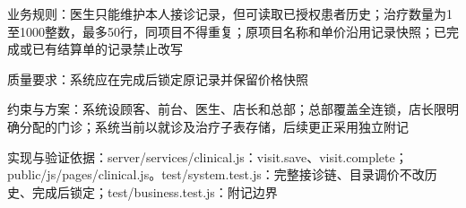 \documentclass[UTF8,12pt,a4paper,fontset=none]{ctexart}
\begin{document}
业务规则：医生只能维护本人接诊记录，但可读取已授权患者历史；治疗数量为1至1000整数，最多50行，同项目不得重复；原项目名称和单价沿用记录快照；已完成或已有结算单的记录禁止改写\par
质量要求：系统应在完成后锁定原记录并保留价格快照\par
约束与方案：系统设顾客、前台、医生、店长和总部；总部覆盖全连锁，店长限明确分配的门诊；系统当前以就诊及治疗子表存储，后续更正采用独立附记\par
实现与验证依据：server/\allowbreak{}services/\allowbreak{}clinical.\allowbreak{}js：visit.\allowbreak{}save、visit.\allowbreak{}complete；public/\allowbreak{}js/\allowbreak{}pages/\allowbreak{}clinical.\allowbreak{}js。test/\allowbreak{}system.\allowbreak{}test.\allowbreak{}js：完整接诊链、目录调价不改历史、完成后锁定；test/\allowbreak{}business.\allowbreak{}test.\allowbreak{}js：附记边界\par
{}
\end{document}
